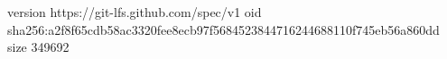 version https://git-lfs.github.com/spec/v1
oid sha256:a2f8f65cdb58ac3320fee8ecb97f5684523844716244688110f745eb56a860dd
size 349692
